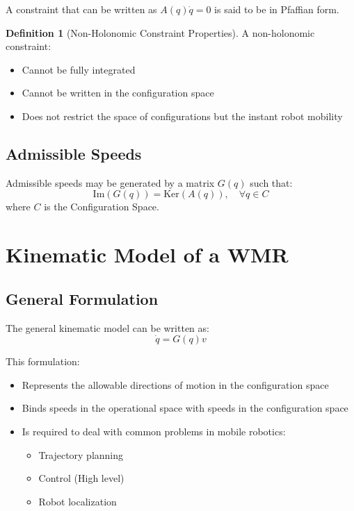 \documentclass[openany]{book}
\theoremstyle{definition}
\newtheorem{definition}{Definition}[section]
\theoremstyle{remark}
\begin{document}
A constraint that can be written as $A(q)\dot{q} = 0$ is said to be in Pfaffian form.

\begin{definition}[Non-Holonomic Constraint Properties]
A non-holonomic constraint:
\begin{itemize}
    \item Cannot be fully integrated
    \item Cannot be written in the configuration space
    \item Does not restrict the space of configurations but the instant robot mobility
\end{itemize}
\end{definition}

\subsection{Admissible Speeds}
Admissible speeds may be generated by a matrix $G(q)$ such that:
\begin{equation}
    \text{Im}(G(q)) = \text{Ker}(A(q)), \quad \forall q \in C
\end{equation}
where $C$ is the Configuration Space.

\section{Kinematic Model of a WMR}

\subsection{General Formulation}
The general kinematic model can be written as:
\begin{equation}
    \dot{q} = G(q)v
\end{equation}

This formulation:
\begin{itemize}
    \item Represents the allowable directions of motion in the configuration space
    \item Binds speeds in the operational space with speeds in the configuration space
    \item Is required to deal with common problems in mobile robotics:
    \begin{itemize}
        \item Trajectory planning
        \item Control (High level)
        \item Robot localization
    \end{itemize}
\end{itemize}
\end{document}
